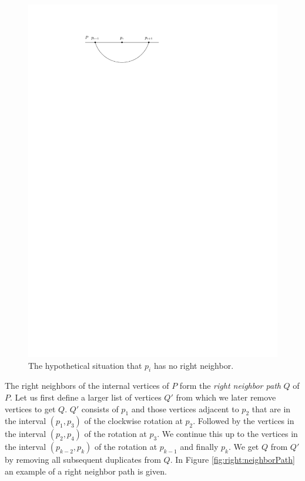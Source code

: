     \begin{figure}[b]
      \centering
      \includegraphics[scale=1]{unifiedAlgo/img/rightNeighbourwalk/pHasRightNeighbor.pdf}
      \caption{The hypothetical situation that $p_i$ has no right neighbor.}
      \label{fig:right:pHasRightNeighbor}
    \end{figure}

    The right neighbors of the internal vertices of $P$ form the \emph{right neighbor path} $Q$ of $P$.
    Let us first define a larger list of vertices $Q'$ from which we later remove vertices to get $Q$. $Q'$ consists of $p_1$ and those vertices adjacent to $p_{2}$ that are in the interval $(p_1, p_3)$ of the clockwise rotation at $p_2$. Followed by the vertices in the interval $(p_2, p_4)$ of the rotation at $p_{3}$. We continue this up to the vertices in the interval $(p_{k-2}, p_k)$ of the rotation at $p_{k-1}$ and finally $p_k$.
    We get $Q$ from $Q'$ by removing all subsequent duplicates from $Q$.
    In Figure \ref{fig:right:neighborPath} an example of a right neighbor path is given.

